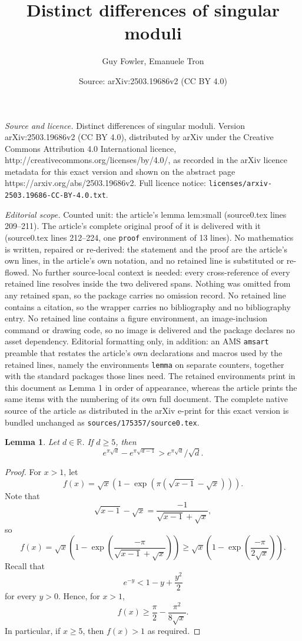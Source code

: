 \documentclass[10pt,a4paper]{amsart}
\title{Distinct differences of singular moduli}
\author{Guy Fowler, Emanuele Tron}
\date{Source: arXiv:2503.19686v2 (CC BY 4.0)}
\newtheorem{lemma}{Lemma}
\begin{document}
\maketitle

\noindent\emph{Source and licence.} Distinct differences of singular moduli. Version arXiv:2503.19686v2 (CC BY 4.0), distributed by arXiv under the Creative Commons Attribution 4.0 International licence, http://creativecommons.org/licenses/by/4.0/, as recorded in the arXiv licence metadata for this exact version and shown on the abstract page https://arxiv.org/abs/2503.19686v2. Full licence notice: \texttt{licenses/arxiv-2503.19686-CC-BY-4.0.txt}.\par\smallskip

\noindent\textit{Editorial scope.} Counted unit: the article's lemma lem:small (source0.tex lines 209--211). The article's complete original proof of it is delivered with it (source0.tex lines 212--224, one \texttt{proof} environment of 13 lines). No mathematics is written, repaired or re-derived: the statement and the proof are the article's own lines, in the article's own notation, and no retained line is substituted or re-flowed.  No further source-local context is needed: every cross-reference of every retained line resolves inside the two delivered spans.  Nothing was omitted from any retained span, so the package carries no omission record.  No retained line contains a citation, so the wrapper carries no bibliography and no bibliography entry.  No retained line contains a figure environment, an image-inclusion command or drawing code, so no image is delivered and the package declares no asset dependency.  Editorial formatting only, in addition: an AMS \texttt{amsart} preamble that restates the article's own declarations and macros used by the retained lines, namely the environments \texttt{lemma} on separate counters, together with the standard packages those lines need.  The retained environments print in this document as Lemma 1 in order of appearance, whereas the article prints the same items with the numbering of its own full document.  The complete native source of the article as distributed in the arXiv e-print for this exact version is bundled unchanged as \texttt{sources/175357/source0.tex}.
	\begin{lemma}\label{lem:small} Let $d \in \mathbb{R}$. If $d \geq 5$, then
		\[ e^{\pi \sqrt{d}}-e^{\pi \sqrt{d-1}} > e^{\pi \sqrt{d}}/\sqrt{d}. \]	
	\end{lemma}

	\begin{proof}
	For $x>1$, let
		\[ f(x) = \sqrt{x} \left(1 - \exp(\pi (\sqrt{x-1} - \sqrt{x}))\right).\]
		Note that
		\[ \sqrt{x-1} - \sqrt{x} = \frac{-1}{\sqrt{x-1} + \sqrt{x}},\]
		so
		\[ f(x) = \sqrt{x} \left(1 - \exp\left(\frac{-\pi}{\sqrt{x-1} + \sqrt{x}}\right)\right)  \geq \sqrt{x}\left(1 - \exp\left(\frac{-\pi}{2 \sqrt{x}}\right)\right).\]
		Recall that
		\[ e^{-y} < 1 - y +\frac{y^2}{2}\]
		for every $y>0$. Hence, for $x> 1$,
		\[ f(x) \geq \frac{\pi}{2} - \frac{\pi^2}{8 \sqrt{x}}.\]
		In particular, if $x \geq 5$, then $f(x) > 1$ as required.
	\end{proof}
\end{document}
